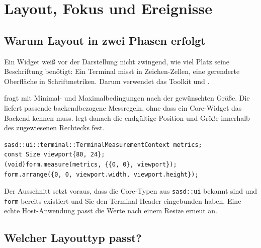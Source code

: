 \chapter{Layout, Fokus und Ereignisse}\label{chap:layout}

\section{Warum Layout in zwei Phasen erfolgt}
Ein Widget weiß vor der Darstellung nicht zwingend, wie viel
Platz seine Beschriftung benötigt: Ein Terminal misst in
Zeichen-Zellen, eine gerenderte Oberfläche in Schriftmetriken.
Darum verwendet das Toolkit  und .

 fragt mit Minimal- und Maximalbedingungen
nach der gewünschten Größe. Die 
liefert passende backendbezogene Messregeln, ohne dass
ein Core-Widget das Backend kennen muss.
 legt danach die endgültige Position
und Größe innerhalb des zugewiesenen Rechtecks fest.

\begin{lstlisting}[language=SASDCpp]
sasd::ui::terminal::TerminalMeasurementContext metrics;
const Size viewport{80, 24};
(void)form.measure(metrics, {{0, 0}, viewport});
form.arrange({0, 0, viewport.width, viewport.height});
\end{lstlisting}
Der Ausschnitt setzt voraus, dass die Core-Typen aus
\texttt{sasd::ui} bekannt sind und \texttt{form}
bereits existiert und Sie den Terminal-Header
eingebunden haben. Eine echte Host-Anwendung passt
die Werte nach einem Resize erneut an.

\section{Welcher Layouttyp passt?}

